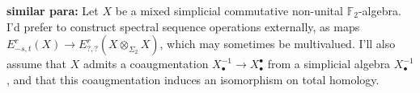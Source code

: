 \documentclass[11pt]{amsart}
\theoremstyle{plain}
\theoremstyle{definition}
\let\phi\varphi
\renewcommand{\to}{\longrightarrow}
\theoremstyle{plain}
\newcommand{\Nabla}{\nabla}
\newcommand{\F}{\mathbb{F}}
\begin{document}
\begin{second quadrant homotopy}
\begin{shaded}
\textbf{similar para:} Let $X$ be a mixed simplicial commutative non-unital $\F_2$-algebra. I'd prefer to construct spectral sequence operations externally, as maps $E^r_{-s,t}(X)\to E^r_{?,?}(X\otimes_{\Sigma_2}X)$, which may sometimes be multivalued. I'll also assume that $X$ admits a coaugmentation $X^{-1}_\bullet\to X^\bullet_\bullet$ from a simplicial algebra $X^{-1}_\bullet$, and that this coaugmentation induces an isomorphism on total homology.
%


\end{shaded}
\end{second quadrant homotopy}
\end{document}
